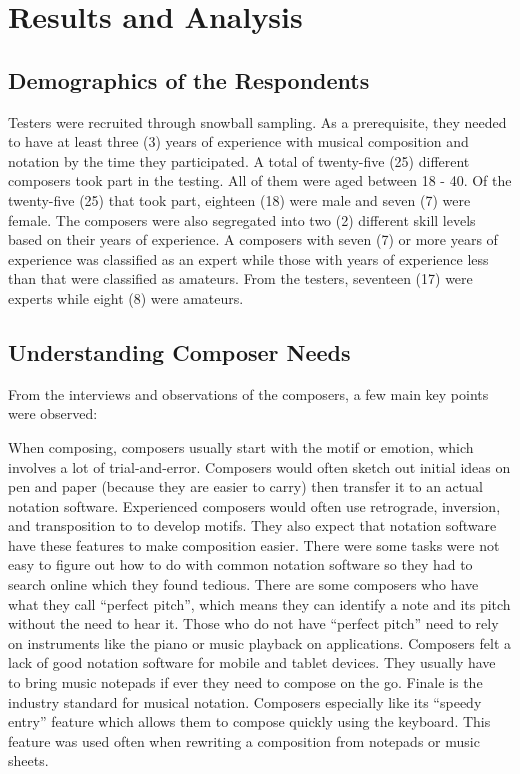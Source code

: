 
\chapter{Results and Analysis}	

	\section{Demographics of the Respondents}
	\label{sec:demographics}
		
		Testers were recruited through snowball sampling. As a prerequisite, they needed to have at least three (3) years of experience with musical composition and notation by the time they participated. A total of twenty-five (25) different composers took part in the testing. All of them were aged between 18 - 40. Of the twenty-five (25) that took part, eighteen (18) were male and seven (7) were female. The composers were also segregated into two (2) different skill levels based on their years of experience. A composers with seven (7) or more years of experience was classified as an expert while those with years of experience less than that were classified as amateurs. From the testers, seventeen (17) were experts while eight (8) were amateurs. 

	\section{Understanding Composer Needs}

		From the interviews and observations of the composers, a few main key points were observed:
		\begin{outline}
			\1 When composing, composers usually start with the motif or emotion, which involves a lot of trial-and-error.
			\1 Composers would often sketch out initial ideas on pen and paper (because they are easier to carry) then transfer it to an actual notation software. 
			\1 Experienced composers would often use retrograde, inversion, and transposition to to develop motifs. They also expect that notation software have these features to make composition easier. 
			\1 There were some tasks were not easy to figure out how to do with common notation software so they had to search online which they found tedious. 
			\1 There are some composers who have what they call ``perfect pitch'', which means they can identify a note and its pitch without the need to hear it. Those who do not have ``perfect pitch'' need to rely on instruments like the piano or music playback on applications. 
			\1 Composers felt a lack of good notation software for mobile and tablet devices. They usually have to bring music notepads if ever they need to compose on the go. 
			\1 Finale is the industry standard for musical notation. Composers especially like its ``speedy entry'' feature which allows them to compose quickly using the keyboard. This feature was used often when rewriting a composition from notepads or music sheets. 
		\end{outline}

